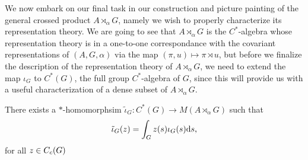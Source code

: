 We now embark on our final task in our construction and picture painting of the general crossed product $A \rtimes_ \alpha G$, namely we wish to properly characterize its representation theory. We are going to see that $A \rtimes_\alpha G$ is the $C^*$-algebra whose representation theory is in a one-to-one correspondance with the covariant representations of $(A,G,\alpha)$ via the map $(\pi,u) \mapsto \pi \rtimes u$, but before we finalize the description of the representation theory of $A \rtimes_\alpha G$, we need to extend the map $\iota_G$ to $C^*(G)$, the full group $C^*$-algebra of $G$, since this will provide us with a useful characterization of a dense subset of $A \rtimes_\alpha G$.
\begin{lemma}
There exists a $*$-homomorphsim $\tilde \iota_G \colon C^*(G) \to M(A \rtimes_\alpha G)$ such that
\begin{align*}
	\tilde \iota_G(z) = \int_G z(s) \iota_G(s) \mathrm{d} s, 
\end{align*}
for all $z \in C_c(G)$
\label{cross:2.35}
\end{lemma}
